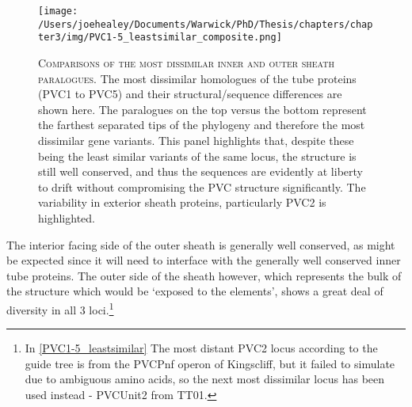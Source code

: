 \begin{landscape}
\begin{figure}[p]
 \centering
  \texttt{[image: /Users/joehealey/Documents/Warwick/PhD/Thesis/chapters/chapter3/img/PVC1-5\_leastsimilar\_composite.png]}
 \captionsetup{singlelinecheck=off, justification=justified, font=footnotesize, aboveskip=10pt}
 \caption[Comparisons of the most dissimilar tube proteins]{\textsc{\normalsize Comparisons of the most dissimilar inner and outer sheath paralogues.}\vspace{0.1cm} \newline The most dissimilar homologues of the tube proteins (PVC1 to PVC5) and their structural/sequence differences are shown here. The paralogues on the top versus the bottom represent the farthest separated tips of the phylogeny and therefore the most dissimilar gene variants. This panel highlights that, despite these being the least similar variants of the same locus, the structure is still well conserved, and thus the sequences are evidently at liberty to drift without compromising the PVC structure significantly. The variability in exterior sheath proteins, particularly PVC2 is highlighted.}
 \label{PVC1-5_leastsimilar}
\end{figure}
\end{landscape}



The interior facing side of the outer sheath is generally well conserved, as might be expected since it will need to interface with the generally well conserved inner tube proteins. The outer side of the sheath however, which represents the bulk of the structure which would be `exposed to the elements', shows a great deal of diversity in all 3 loci.\footnote{In \vref{PVC1-5_leastsimilar} The most distant PVC2 locus according to the guide tree is from the PVCPnf operon of \Pasy{} Kingscliff, but it failed to simulate due to ambiguous amino acids, so the next most dissimilar locus has been used instead - PVCUnit2 from \Plum{} TT01.}

